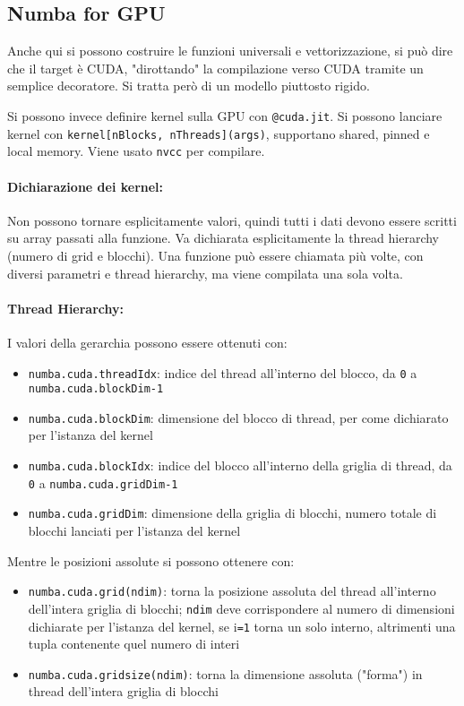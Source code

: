 \subsection{Numba for GPU}

Anche qui si possono costruire le funzioni universali e vettorizzazione, si può dire che il target è CUDA, "dirottando" la compilazione verso CUDA tramite un semplice decoratore. Si tratta però di un modello piuttosto rigido.

Si possono invece definire kernel sulla GPU con \texttt{@cuda.jit}. Si possono lanciare kernel con \texttt{kernel[nBlocks, nThreads](args)}, supportano shared, pinned e local memory. Viene usato \texttt{nvcc} per compilare.

\paragraph{Dichiarazione dei kernel:} Non possono tornare esplicitamente valori, quindi tutti i dati devono essere scritti su array passati alla funzione. Va dichiarata esplicitamente la thread hierarchy (numero di grid e blocchi). Una funzione può essere chiamata più volte, con diversi parametri e thread hierarchy, ma viene compilata una sola volta.

\paragraph{Thread Hierarchy:} I valori della gerarchia possono essere ottenuti con: 
\begin{itemize}
	\item \texttt{numba.cuda.threadIdx}: indice del thread all'interno del blocco, da \texttt{0} a \texttt{numba.cuda.blockDim-1}
	
	\item \texttt{numba.cuda.blockDim}: dimensione del blocco di thread, per come dichiarato per l'istanza del kernel 
	
	\item \texttt{numba.cuda.blockIdx}: indice del blocco all'interno della griglia di thread, da \texttt{0} a \texttt{numba.cuda.gridDim-1}
	
	\item \texttt{numba.cuda.gridDim}: dimensione della griglia di blocchi, numero totale di blocchi lanciati per l'istanza del kernel
\end{itemize}

Mentre le posizioni assolute si possono ottenere con: 
\begin{itemize}
	\item \texttt{numba.cuda.grid(ndim)}: torna la posizione assoluta del thread all'interno dell'intera griglia di blocchi; \texttt{ndim} deve corrispondere al numero di dimensioni dichiarate per l'istanza del kernel, se i\texttt{=1} torna un solo interno, altrimenti una tupla contenente quel numero di interi
	
	\item \texttt{numba.cuda.gridsize(ndim)}: torna la dimensione assoluta ("forma") in thread dell'intera griglia di blocchi
\end{itemize}

